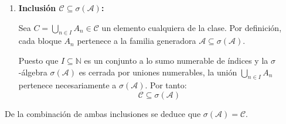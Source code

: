 \begin{problema}
\begin{enumerate}[label=\arabic*.]
\begin{enumerate}[label=\alph*)]
        \item \textit{Cierre por uniones numerables:} Sea $\{C_k\}_{k \in \mathbb{N}} \subseteq \mathcal{C}$, donde cada $C_k = \bigcup_{n \in I_k} A_n$ para algún subconjunto de índices $I_k \subseteq \mathbb{N}$. La unión numerable resulta:
        \[
            \bigcup_{k=1}^\infty C_k = \bigcup_{k=1}^\infty \left( \bigcup_{n \in I_k} A_n \right) = \bigcup_{n \in \bigcup_{k=1}^\infty I_k} A_n
        \]
        Al ser $\bigcup_{k=1}^\infty I_k \subseteq \mathbb{N}$, la unión pertenece a $\mathcal{C}$.
    \end{enumerate}
    
    Así, $\mathcal{C}$ es una $\sigma$-álgebra. Además, tomando $I = \{n\}$ para cada $n \in \mathbb{N}$, tenemos que $A_n \in \mathcal{C}$, de modo que $\mathcal{A} \subseteq \mathcal{C}$. Como $\sigma(\mathcal{A})$ es la minimal entre las $\sigma$-álgebras que contienen a $\mathcal{A}$, concluimos que:
    \[
        \sigma(\mathcal{A}) \subseteq \mathcal{C}
    \]

    \item \textbf{Inclusión $\mathcal{C} \subseteq \sigma(\mathcal{A})$:}
    
    Sea $C = \bigcup_{n \in I} A_n \in \mathcal{C}$ un elemento cualquiera de la clase. Por definición, cada bloque $A_n$ pertenece a la familia generadora $\mathcal{A} \subseteq \sigma(\mathcal{A})$.
    
    Puesto que $I \subseteq \mathbb{N}$ es un conjunto a lo sumo numerable de índices y la $\sigma$-álgebra $\sigma(\mathcal{A})$ es cerrada por uniones numerables, la unión $\bigcup_{n \in I} A_n$ pertenece necesariamente a $\sigma(\mathcal{A})$. Por tanto:
    \[
        \mathcal{C} \subseteq \sigma(\mathcal{A})
    \]
\end{enumerate}

De la combinación de ambas inclusiones se deduce que $\sigma(\mathcal{A}) = \mathcal{C}$.
\end{problema}

\newpage
